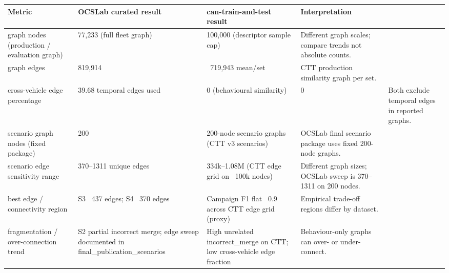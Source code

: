\begin{tabular}{llll}
\toprule
Metric & OCSLab curated result & can-train-and-test result & Interpretation \\
\midrule
graph nodes (production / evaluation graph) & 77,233 (full fleet graph) & 100,000 (descriptor sample cap) & Different graph scales; compare trends not absolute counts. \\
graph edges & 819,914 & ~719,943 mean/set & CTT production similarity graph per set. \\
cross-vehicle edge percentage & 39.68%
temporal edges used & 0 (behavioural similarity) & 0 & Both exclude temporal edges in reported graphs. \\
scenario graph nodes (fixed package) & 200 & 200-node scenario graphs (CTT v3 scenarios) & OCSLab final scenario package uses fixed 200-node graphs. \\
scenario edge sensitivity range & 370–1311 unique edges & 334k–1.08M (CTT edge grid on ~100k nodes) & Different graph sizes; OCSLab sweep is 370–1311 on 200 nodes. \\
best edge / connectivity region & S3 ~437 edges; S4 ~370 edges & Campaign F1 flat ~0.9 across CTT edge grid (proxy) & Empirical trade-off regions differ by dataset. \\
fragmentation / over-connection trend & S2 partial incorrect merge; edge sweep documented in final_publication_scenarios & High unrelated incorrect_merge on CTT; low cross-vehicle edge fraction & Behaviour-only graphs can over- or under-connect. \\
\bottomrule
\end{tabular}
